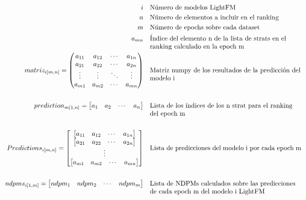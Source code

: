 \begin{align*}
i && \parbox[t]{8cm}{\raggedright Número de modelos LightFM} \nonumber 
&& \\
n && \parbox[t]{8cm}{\raggedright Número de elementos a incluir en el ranking} \nonumber 
&& \\
m && \parbox[t]{8cm}{\raggedright Número de epochs sobre cada dataset} \nonumber
&& \\
a_{mn} && \parbox[t]{8cm}{\raggedright Índice del elemento n de la lista de strats en el ranking calculado en la epoch m} \nonumber
&& \\
matriz_{i[m,n]}= \begin{pmatrix}
 a_{11}  &  a_{12}  &  \cdots   & a_{1n} \\ 
 a_{21}  &  a_{22}  &  \cdots   & a_{2n}\\ 
 \vdots  &  \vdots  &  \ddots & \vdots  \\ 
 a_{m1}  &  a_{m2}  &  \cdots   & a_{mn}
\end{pmatrix}  && \parbox[t]{8cm}{\raggedright Matriz numpy de los resultados de la predicción del modelo i} \nonumber
&& \\ \\
prediction_{m[1,n]}= \begin{bmatrix} a_{1}  &  a_{2}  &  \cdots   & a_{n} \end{bmatrix} && \parbox[t]{8cm}{\raggedright Lista de los índices de los n strat para el ranking del epoch m} \nonumber
\\ \\
Predictions_{i[m,n]} = \begin{bmatrix}
 \begin{bmatrix} a_{11}  &  a_{12}  &  \cdots   & a_{1n} \end{bmatrix} \\ 
 \begin{bmatrix} a_{21}  &  a_{22}  &  \cdots   & a_{2n} \end{bmatrix}\\ 
 \vdots \\ 
 \begin{bmatrix} a_{m1}  &  a_{m2}  &  \cdots   & a_{mn} \end{bmatrix}
\end{bmatrix} && \parbox[t]{8cm}{\raggedright Lista de predicciones del modelo i por cada epoch m} \nonumber
&& \\ \\
ndpms_{i[1,m]}= \begin{bmatrix} ndpm_{1}  &  ndpm_{2}  &  \cdots   & ndpm_{m} \end{bmatrix} && \parbox[t]{8cm}{\raggedright Lista de NDPMs calculados sobre las predicciones de cada epoch m del  modelo i LightFM} \nonumber
\end{align*}
